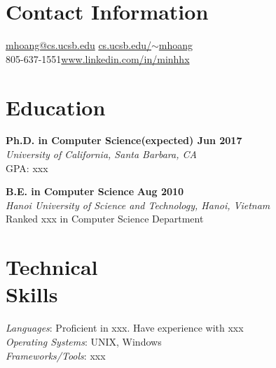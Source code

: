 \documentclass[margin,line]{res}
\begin{document}
\begin{resume}


\section{\sc Contact Information}
%
%
%

%
\href{mailto:mhoang@cs.ucsb.edu}{mhoang@cs.ucsb.edu} \hfill \href{http://cs.ucsb.edu/\~mhoang}{cs.ucsb.edu/$\sim$mhoang} \\
805-637-1551\hfill \href{https://www.linkedin.com/in/minhhx}{www.linkedin.com/in/minhhx}
\vspace*{-0.05in}

\section{\sc Education}
{\bf Ph.D. in Computer Science}\hfill {\bf (expected) Jun 2017}\\
\emph{University of California, Santa Barbara, CA}\\
GPA: xxx
\vspace*{-0.05in}

{\bf B.E. in Computer Science} \hfill {\bf Aug 2010}\\
\emph{Hanoi University of Science and Technology, Hanoi, Vietnam}\\
Ranked xxx in Computer Science Department
\vspace*{-0.05in}

\section{\sc Technical\\Skills}
\emph{Languages}: Proficient in xxx. Have experience with xxx\vspace*{0.02in}\\
\emph{Operating Systems}: UNIX, Windows\vspace*{0.02in}\\
\emph{Frameworks/Tools}: xxx
\vspace*{-0.05in}


\end{resume}
\end{document}
